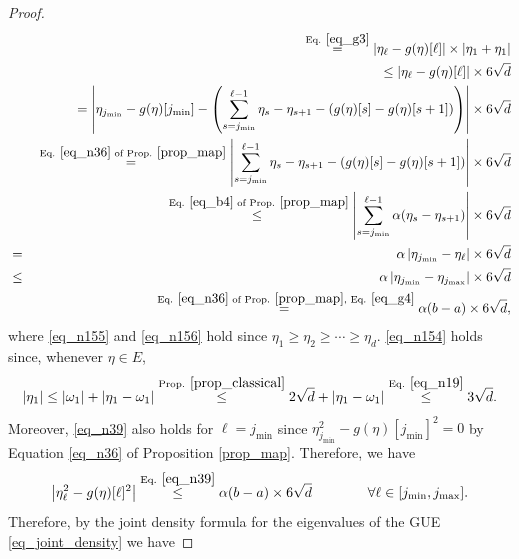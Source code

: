 \documentclass[11pt,letterpaper]{article}
\begin{document}
\begin{proof}
\begin{eqnarray}
%
 & & \stackrel{\textrm{Eq. } \eqref{eq_g3}}{=} |\eta_{\ell} - g(\eta)[\ell]|\times |\eta_{1} + \eta_{1}| \nonumber\\
%
& & \leq  |\eta_{\ell} - g(\eta)[\ell]| \times  6 \sqrt{d} \label{eq_n154}\\
%
& & =  \left|\eta_{j_{\mathrm{min}}} - g(\eta)[j_{\mathrm{min}}] - \left( \sum_{s = j_{\mathrm{min}}}^{\ell-1} \eta_{s} - \eta_{s+1} - (g(\eta)[s]-g(\eta)[s+1]) \right ) \right| \times  6 \sqrt{d}\nonumber\\
%
& & \stackrel{\textrm{ Eq. } \eqref{eq_n36} \textrm{ of Prop. } \ref{prop_map}}{=}  \left | \sum_{s = j_{\mathrm{min}}}^{\ell-1} \eta_{s} - \eta_{s+1} - (g(\eta)[s]-g(\eta)[s+1]) \right | \times  6 \sqrt{d}\nonumber\\
%
& & \stackrel{\textrm{ Eq. } \eqref{eq_b4} \textrm{ of Prop. } \ref{prop_map}}{\leq}  \left| \sum_{s = j_{\mathrm{min}}}^{\ell-1}  \alpha(\eta_{s} - \eta_{s+1}) \right | \times  6 \sqrt{d}\nonumber\\
%
 &=& \alpha \left| \eta_{j_{\mathrm{min}}} - \eta_{\ell} \right | \times  6 \sqrt{d}\nonumber\\
  &\leq & \alpha \left| \eta_{j_{\mathrm{min}}} - \eta_{j_{\mathrm{max}}} \right | \times  6 \sqrt{d} \label{eq_n156}\\
& & \stackrel{\textrm{ Eq. } \eqref{eq_n36} \textrm{ of Prop. } \ref{prop_map}, \textrm{ Eq. } \eqref{eq_g4}}{=} \alpha (b-a)\times  6 \sqrt{d}, \label{eq_n39}
%
\end{eqnarray}
%
where \eqref{eq_n155} and \eqref{eq_n156} hold since $\eta_1 \geq \eta_2 \geq \cdots \geq \eta_d$.   \eqref{eq_n154} holds since, whenever $\eta \in E$,
\begin{equation*}
|\eta_1| \leq |\omega_1| + |\eta_1 - \omega_1|  \stackrel{\textrm{Prop. } \eqref{prop_classical}}{\leq} 2 \sqrt{d} + |\eta_1 - \omega_1| \stackrel{\textrm{Eq. } \eqref{eq_n19}}{\leq} 3 \sqrt{d}.
\end{equation*}
%
Moreover, \eqref{eq_n39} also holds for $\ell = j_{\mathrm{min}}$ since $\eta_{j_{\mathrm{min}}}^2 - g(\eta)[j_{\mathrm{min}}]^2 = 0$ by Equation \eqref{eq_n36} of Proposition \ref{prop_map}.
%
Therefore, we have
%
\begin{equation}\label{eq_n40}
 \left|\eta_{\ell}^2 - g(\eta)[\ell]^2\right|    \stackrel{\textrm{Eq. } \eqref{eq_n39}}{\leq} \alpha (b-a)\times  6 \sqrt{d} \qquad \qquad \forall \ell \in [j_{\mathrm{min}},j_{\mathrm{max}}].
\end{equation}
%
Therefore, by the joint density formula for the eigenvalues of the GUE \eqref{eq_joint_density} we have

\end{proof}
\end{document}
